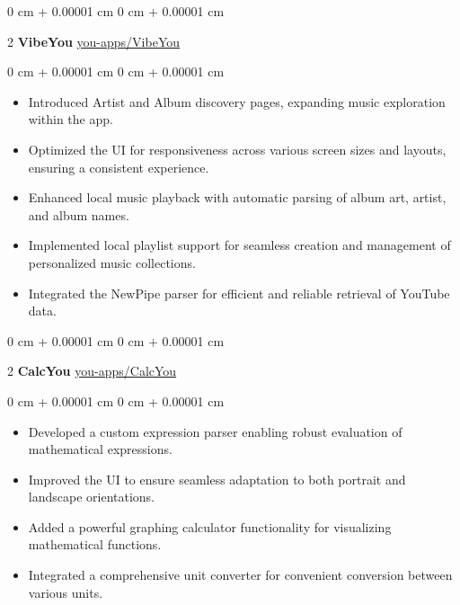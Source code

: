 \documentclass[10pt, letterpaper]{article}
\newenvironment{highlights}{ \begin{itemize}[ topsep=0.10 cm, parsep=0.10 cm, partopsep=0pt,
itemsep=0pt, leftmargin=0 cm + 10pt ] }{ \end{itemize} } %
\newenvironment{onecolentry}{ \begin{adjustwidth}{ 0 cm + 0.00001 cm }{ 0 cm + 0.00001 cm }
}{ \end{adjustwidth} } %
\newenvironment{twocolentry}[2][]{ \onecolentry \def\secondColumn{#2} \setcolumnwidth{\fill, 4.5 cm}
\begin{paracol}{2} }{ \switchcolumn \raggedleft \secondColumn \end{paracol}
\endonecolentry } %
\begin{document}
  \vspace{0.2 cm}
  \begin{twocolentry}
    {\href{https://github.com/you-apps/VibeYou}{you-apps/VibeYou}} \textbf{VibeYou}
  \end{twocolentry}
  \vspace{0.10 cm}
  \begin{onecolentry}
    \begin{highlights}
      \item Introduced Artist and Album discovery pages, expanding music
      exploration within the app. \item Optimized the UI for responsiveness across
      various screen sizes and layouts, ensuring a consistent experience. \item Enhanced
      local music playback with automatic parsing of album art, artist, and album
      names. \item Implemented local playlist support for seamless creation and
      management of personalized music collections. \item Integrated the NewPipe parser
      for efficient and reliable retrieval of YouTube data.
    \end{highlights}
  \end{onecolentry}
  \vspace{0.2 cm}
  \begin{twocolentry}
    {\href{https://github.com/you-apps/CalcYou}{you-apps/CalcYou}} \textbf{CalcYou}
  \end{twocolentry}
  \vspace{0.10 cm}
  \begin{onecolentry}
    \begin{highlights}
      \item Developed a custom expression parser enabling robust evaluation of mathematical
      expressions. \item Improved the UI to ensure seamless adaptation to both
      portrait and landscape orientations. \item Added a powerful graphing calculator
      functionality for visualizing mathematical functions. \item Integrated a
      comprehensive unit converter for convenient conversion between various
      units.
    \end{highlights}
  \end{onecolentry}
  \vspace{0.2 cm}
\end{document}
